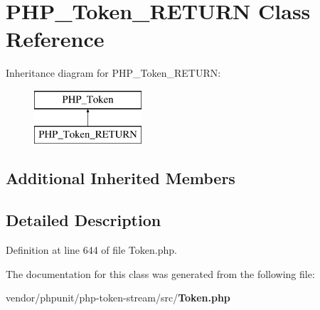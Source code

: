 \section{P\+H\+P\+\_\+\+Token\+\_\+\+R\+E\+T\+U\+R\+N Class Reference}
\label{class_p_h_p___token___r_e_t_u_r_n}
Inheritance diagram for P\+H\+P\+\_\+\+Token\+\_\+\+R\+E\+T\+U\+R\+N\+:\begin{figure}[H]
\begin{center}
\leavevmode
\includegraphics[height=2.000000cm]{class_p_h_p___token___r_e_t_u_r_n}
\end{center}
\end{figure}
\subsection*{Additional Inherited Members}


\subsection{Detailed Description}


Definition at line 644 of file Token.\+php.



The documentation for this class was generated from the following file\+:\begin{DoxyCompactItemize}
\item 
vendor/phpunit/php-\/token-\/stream/src/{\bf Token.\+php}\end{DoxyCompactItemize}
